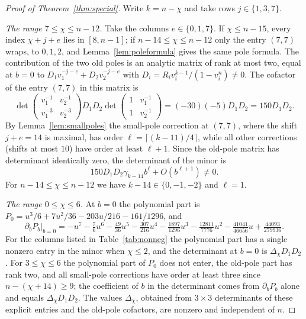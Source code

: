 \documentclass{amsart}
\theoremstyle{definition}
\theoremstyle{remark}
\numberwithin{equation}{section}
\begin{document}
\begin{proof}[Proof of Theorem~\ref{thm:special}]
Write $k=n-\chi$ and take rows $j\in\{1,3,7\}$.

\emph{The range $7\le\chi\le n-12$.} Take the columns $e\in\{0,1,7\}$. If
$\chi\le n-15$, every index $\chi+j+e$ lies in $[8,n-1]$; if
$n-14\le\chi\le n-12$ only the entry $(7,7)$ wraps, to $0,1,2$, and
Lemma~\ref{lem:poleformula} gives the same pole formula. The contribution of the
two old poles is an analytic matrix of rank at most two, equal at $b=0$ to
$D_1v_1^{-j-e}+D_2v_2^{-j-e}$ with $D_i=R_iv_i^{k-1}/(1-v_i^n)\ne0$. The cofactor
of the entry $(7,7)$ in this matrix is
\[
  \det\begin{pmatrix}v_1^{-1}&v_2^{-1}\\ v_1^{-3}&v_2^{-3}\end{pmatrix}D_1D_2
  \det\begin{pmatrix}1&v_1^{-1}\\1&v_2^{-1}\end{pmatrix}=(-30)(-5)D_1D_2=150D_1D_2 .
\]
By Lemma~\ref{lem:smallpoles} the small-pole correction at $(7,7)$, where the shift
$j+e=14$ is maximal, has order $\ell=\lceil(k-11)/4\rceil$, while all other
corrections (shifts at most $10$) have order at least $\ell+1$. Since the old-pole
matrix has determinant identically zero, the determinant of the minor is
\[
  150D_1D_2\gamma_{k-14}b^\ell+O(b^{\ell+1})\ne0 .
\]
For $n-14\le\chi\le n-12$ we have $k-14\in\{0,-1,-2\}$ and $\ell=1$.

\emph{The range $0\le\chi\le6$.} At $b=0$ the polynomial part is
$P_0=u^3/6+7u^2/36-203u/216-161/1296$, and
\[
  \partial_bP_b|_{b=0}=-u^7-\tfrac76u^6-\tfrac{49}{36}u^5-\tfrac{307}{216}u^4
  -\tfrac{1897}{1296}u^3-\tfrac{12811}{7776}u^2-\tfrac{41041}{46656}u
  +\tfrac{44093}{279936}.
\]
For the columns listed in Table~\ref{tab:nonneg} the polynomial part has a single
nonzero entry in the minor when $\chi\le2$, and the determinant at $b=0$ is
$\Delta_\chi D_1D_2$. For $3\le\chi\le6$ the polynomial part of $P_0$ does not enter, the
old-pole part has rank two, and all small-pole corrections have order at least three
since $n-(\chi+14)\ge9$; the coefficient of $b$ in the determinant comes from
$\partial_bP_b$ alone and equals $\Delta_\chi D_1D_2$. The values $\Delta_\chi$, obtained from
$3\times3$ determinants of these explicit entries and the old-pole cofactors, are
nonzero and independent of $n$.


\end{proof}
\end{document}
